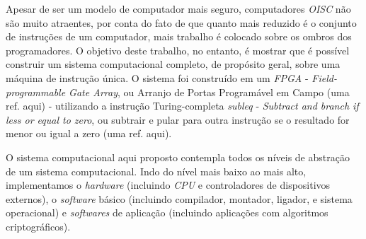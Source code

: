 Apesar de ser um modelo de computador mais seguro, computadores \textit{OISC} não são muito atraentes, por conta do fato de que quanto mais reduzido é o conjunto de instruções de um computador, mais trabalho é colocado sobre os ombros dos programadores. O objetivo deste trabalho, no entanto, é mostrar que é possível construir um sistema computacional completo, de propósito geral, sobre uma máquina de instrução única. O sistema foi construído em um \textit{FPGA} - \textit{Field-programmable Gate Array}, ou Arranjo de Portas Programável em Campo (uma ref. aqui) - utilizando a instrução Turing-completa \textit{subleq} - \textit{Subtract and branch if less or equal to zero}, ou subtrair e pular para outra instrução se o resultado for menor ou igual a zero (uma ref. aqui).

O sistema computacional aqui proposto contempla todos os níveis de abstração de um sistema computacional. Indo do nível mais baixo ao mais alto, implementamos o \textit{hardware} (incluindo \textit{CPU} e controladores de dispositivos externos), o \textit{software} básico (incluindo compilador, montador, ligador, e sistema operacional) e \textit{softwares} de aplicação (incluindo aplicações com algoritmos criptográficos).
